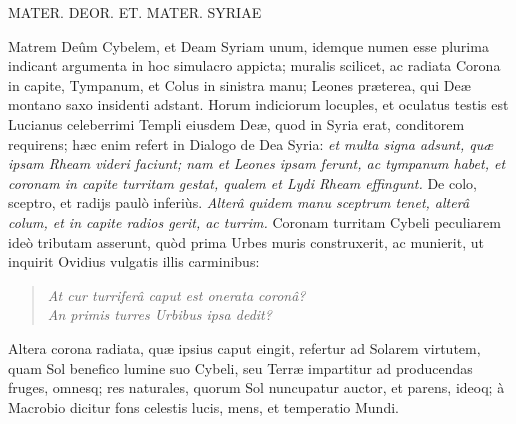 \documentclass[a4paper, 11pt, oneside, polutonikogreek, latin]{article}
\begin{document}
MATER. DEOR. ET. MATER. SYRIAE

Matrem Deûm Cybelem, et Deam Syriam unum, idemque numen esse plurima indicant argumenta in hoc simulacro appicta; muralis scilicet, ac radiata Corona in capite, Tympanum, et Colus in sinistra manu; Leones præterea, qui Deæ montano saxo insidenti adstant. Horum indiciorum locuples, et oculatus testis est Lucianus celeberrimi Templi eiusdem Deæ, quod in Syria erat, conditorem requirens; hæc enim refert in Dialogo de Dea Syria: \emph{et multa signa adsunt, quæ ipsam Rheam videri faciunt; nam et Leones ipsam ferunt, ac tympanum habet, et coronam in capite turritam gestat, qualem et Lydi Rheam effingunt.} De colo, sceptro, et radijs paulò inferiùs. \emph{Alterâ quidem manu sceptrum tenet, alterâ colum, et in capite radios gerit, ac turrim.} Coronam turritam Cybeli peculiarem ideò tributam asserunt, quòd prima Urbes muris construxerit, ac munierit, ut inquirit Ovidius vulgatis illis carminibus:
\begin{quote}
\emph{At cur turriferâ caput est onerata coronâ?}\\
\emph{An primis turres Urbibus ipsa dedit?}\\
\end{quote}
Altera corona radiata, quæ ipsius caput eingit, refertur ad Solarem virtutem, quam Sol benefico lumine suo Cybeli, seu Terræ impartitur ad producendas fruges, omnesq; res naturales, quorum Sol nuncupatur auctor, et parens, ideoq; à Macrobio dicitur fons celestis lucis, mens, et temperatio Mundi.
\end{document}
